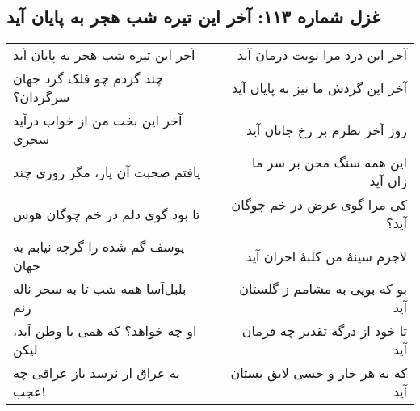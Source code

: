 \begin{center}
\section*{غزل شماره ۱۱۳: آخر این تیره شب هجر به پایان آید}
\label{sec:113}
\begin{longtable}{l p{0.5cm} r}
آخر این تیره شب هجر به پایان آید
&&
آخر این درد مرا نوبت درمان آید
\\
چند گردم چو فلک گرد جهان سرگردان؟
&&
آخر این گردش ما نیز به پایان آید
\\
آخر این بخت من از خواب درآید سحری
&&
روز آخر نظرم بر رخ جانان آید
\\
یافتم صحبت آن یار، مگر روزی چند
&&
این همه سنگ محن بر سر ما زان آید
\\
تا بود گوی دلم در خم چوگان هوس
&&
کی مرا گوی غرض در خم چوگان آید؟
\\
یوسف گم شده را گرچه نیابم به جهان
&&
لاجرم سینهٔ من کلبهٔ احزان آید
\\
بلبل‌آسا همه شب تا به سحر ناله زنم
&&
بو که بویی به مشامم ز گلستان آید
\\
او چه خواهد؟ که همی با وطن آید، لیکن
&&
تا خود از درگه تقدیر چه فرمان آید
\\
به عراق ار نرسد باز عراقی چه عجب!
&&
که نه هر خار و خسی لایق بستان آید
\\
\end{longtable}
\end{center}
